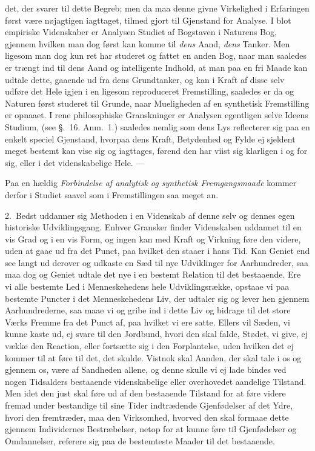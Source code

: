 \documentclass[12pt,a4paper]{book}
\newcommand{\apage}[1]{\marginnote{\footnotesize\textit{[#1]}}}
\begin{document}
det, der svarer til dette Begreb; men da maa denne givne Virkelighed i Erfaringen
først være nøjagtigen iagttaget, tilmed gjort til Gjenstand for Analyse. I blot
empiriske Videnskaber er Analysen Studiet af Bogstaven i Naturens Bog, gjennem
hvilken man dog først kan komme til \emph{dens} Aand, \emph{dens} Tanker. Men ligesom man
dog kun ret har studeret og fattet en anden Bog, naar man saaledes er trængt ind
til dens Aand og intelligente Indhold, at man paa en fri Maade kan udtale dette,
gaaende ud fra dens Grundtanker, og kan i Kraft af disse selv udføre det Hele igjen
i en ligesom reproduceret Fremstilling, saaledes er da og Naturen først studeret
til Grunde, naar Mueligheden af en synthetisk Fremstilling er opnaaet. I rene
philosophiske Granskninger er Analysen egentligen selve Ideens Studium,
(see §.~16. Anm.~1.) saaledes nemlig som dens Lys reflecterer sig paa en enkelt
speciel Gjenstand, hvorpaa dens Kraft, Betydenhed og Fylde ej sjeldent meget
bestemt kan vise sig og iagttages, førend den har viist sig klarligen i og for
sig, eller i det videnskabelige Hele. ---

Paa en hældig \emph{Forbindelse af analytisk og synthetisk Fremgangsmaade} kommer
derfor i Studiet saavel som i Fremstillingen saa meget an.

\apage{158} 2.~Bedst uddanner sig Methoden i en Videnskab af denne selv og dennes egen
historiske Udviklingsgang. Enhver Gransker finder Videnskaben uddannet til en vis
Grad og i en vis Form, og ingen kan med Kraft og Virkning føre den videre, uden at
gaae ud fra det Punct, paa hvilket den staaer i hans Tid. Kan Geniet end see langt
ud derover og udkaste en Sæd til nye Udviklinger for Aarhundreder, saa maa dog og
Geniet udtale det nye i en bestemt Relation til det bestaaende. Ere vi alle
bestemte Led i Menneskehedens hele Udviklingsrække, opstaae vi paa bestemte
Puncter i det Menneskehedens Liv, der udtaler sig og lever hen gjennem
Aarhundrederne, saa maae vi og gribe ind i dette Liv og bidrage til det store
Værks Fremme fra det Punct af, paa hvilket vi ere satte. Ellers vil Sæden, vi
kunne kaste ud, ej svare til den Jordbund, hvori den skal falde, Stødet, vi give,
ej vække den Reaction, eller fortsætte sig i den Forplantelse, uden hvilken det ej
kommer til at føre til det, det skulde. Vistnok skal Aanden, der skal tale i os og
gjennem os, være af Sandheden allene, og denne skulle vi ej lade bindes ved nogen
Tidsalders bestaaende videnskabelige eller overhovedet aandelige Tilstand. Men
idet den just skal føre ud af den bestaaende Tilstand for at føre videre fremad
under bestandige til sine Tider indtrædende Gjenfødelser af det Ydre, hvori den
fremtræder, maa den \apage{159} Virksomhed, hvorved den skal formaae dette gjennem Individernes
Bestræbelser, netop for at kunne føre til Gjenfødelser og Omdannelser, referere
sig paa de bestemteste Maader til det bestaaende.
\end{document}
